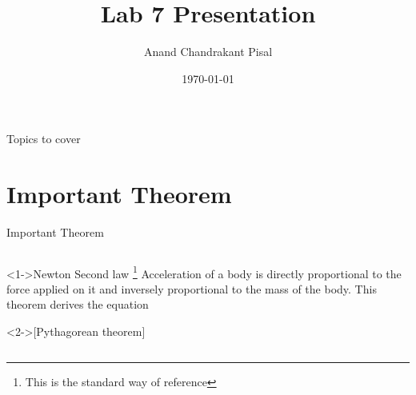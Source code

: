 \documentclass{beamer}
\title[]{Lab 7 Presentation} %
\author{Anand Chandrakant Pisal} %
\institute[IIT Bombay] %
{
IIT Bombay \\ %
\medskip
\textit{183059001@iitb.ac.in} %
}
\date{\today} %
\begin{document}
\begin{frame}
\titlepage
\end{frame}
\begin{frame}{Topics to cover}
	\tableofcontents
\end{frame}
\section{Important Theorem}
\begin{frame}{Important Theorem}
\begin{columns}
\begin{column}[T]{\textwidth}
  	\begin{block}<1->{Newton Second law \footnote[frame]{This is the standard way of reference}}
    Acceleration of a body is directly proportional to the force applied
on it and inversely proportional to the mass of the body. This
theorem derives the equation
	\vspace{0.5cm}
  	\end{block}
  	\begin{theorem}<2->[Pythagorean theorem]
    \vspace{0.5cm}
  	\end{theorem}
\end{column}
\end{columns}	
\end{frame}
\end{document}
